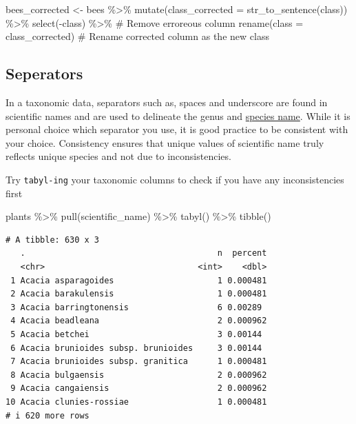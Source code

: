 \documentclass[
  letterpaper,
  DIV=11,
  numbers=noendperiod,
  oneside]{scrreprt}
\newenvironment{Shaded}{\begin{snugshade}}{\end{snugshade}}
\newcommand{\AttributeTok}[1]{\textcolor[rgb]{0.40,0.45,0.13}{#1}}
\newcommand{\CommentTok}[1]{\textcolor[rgb]{0.37,0.37,0.37}{#1}}
\newcommand{\FunctionTok}[1]{\textcolor[rgb]{0.28,0.35,0.67}{#1}}
\newcommand{\NormalTok}[1]{\textcolor[rgb]{0.00,0.23,0.31}{#1}}
\newcommand{\OtherTok}[1]{\textcolor[rgb]{0.00,0.23,0.31}{#1}}
\newcommand{\SpecialCharTok}[1]{\textcolor[rgb]{0.37,0.37,0.37}{#1}}
\begin{document}
\begin{Shaded}
\begin{Highlighting}[]
\NormalTok{bees\_corrected }\OtherTok{\textless{}{-}}\NormalTok{ bees }\SpecialCharTok{\%\textgreater{}\%} 
  \FunctionTok{mutate}\NormalTok{(}\AttributeTok{class\_corrected =} \FunctionTok{str\_to\_sentence}\NormalTok{(class)) }\SpecialCharTok{\%\textgreater{}\%} 
  \FunctionTok{select}\NormalTok{(}\SpecialCharTok{{-}}\NormalTok{class) }\SpecialCharTok{\%\textgreater{}\%} \CommentTok{\# Remove erroreous column }
  \FunctionTok{rename}\NormalTok{(}\AttributeTok{class =}\NormalTok{ class\_corrected) }\CommentTok{\# Rename corrected column as the new \textquotesingle{}class\textquotesingle{}}
\end{Highlighting}
\end{Shaded}

\hypertarget{seperators}{%
\subsection{Seperators}\label{seperators}}

In a taxonomic data, separators such as, spaces and underscore are found
in scientific names and are used to delineate the genus and
\href{https://dwc.tdwg.org/terms/\#dwc:specificEpithet}{species name}.
While it is personal choice which separator you use, it is good practice
to be consistent with your choice. Consistency ensures that unique
values of scientific name truly reflects unique species and not due to
inconsistencies.

Try \texttt{tabyl-ing} your taxonomic columns to check if you have any
inconsistencies first

\begin{Shaded}
\begin{Highlighting}[]
\NormalTok{plants }\SpecialCharTok{\%\textgreater{}\%} 
  \FunctionTok{pull}\NormalTok{(scientific\_name) }\SpecialCharTok{\%\textgreater{}\%} 
  \FunctionTok{tabyl}\NormalTok{() }\SpecialCharTok{\%\textgreater{}\%} 
  \FunctionTok{tibble}\NormalTok{()}
\end{Highlighting}
\end{Shaded}

\begin{verbatim}
# A tibble: 630 x 3
   .                                       n  percent
   <chr>                               <int>    <dbl>
 1 Acacia asparagoides                     1 0.000481
 2 Acacia barakulensis                     1 0.000481
 3 Acacia barringtonensis                  6 0.00289 
 4 Acacia beadleana                        2 0.000962
 5 Acacia betchei                          3 0.00144 
 6 Acacia brunioides subsp. brunioides     3 0.00144 
 7 Acacia brunioides subsp. granitica      1 0.000481
 8 Acacia bulgaensis                       2 0.000962
 9 Acacia cangaiensis                      2 0.000962
10 Acacia clunies-rossiae                  1 0.000481
# i 620 more rows
\end{verbatim}
\end{document}

